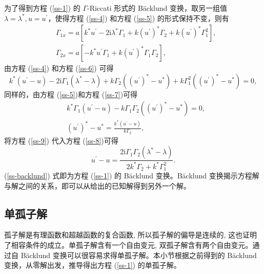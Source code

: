 为了得到方程 (\ref{ss-1}) 的 $\Gamma$-Riccati 形式的 B\"acklund 变换，取另一组值 $\lambda = \lambda^{*}, u = u^{'}$，使得方程 (\ref{ss-4}) 和方程 (\ref{ss-5}) 的形式保持不变，则有
\begin{align}
  & \Gamma_{1x} = a\left[k^{*}u^{'} - 2\mathrm{i}\lambda^{*}\Gamma_{1} + k(u^{'})^{*}\Gamma_{2} + k(u^{'})^{*}\Gamma_{1}^{2}\right], \label{ss-6} \\
  & \Gamma_{2x} = a\left[-k^{*}u^{'}\Gamma_{1} + k(u^{'})^{*}\Gamma_{1}\Gamma_{2}\right], \label{ss-7}
\end{align}
由方程 (\ref{ss-4}) 和方程 (\ref{ss-6}) 可得
\begin{equation}
  k^{*}(u^{'}-u) - 2\mathrm{i}\Gamma_{1}(\lambda^{*}-\lambda) + k\Gamma_{2}((u^{'})^{*}-u^{*}) + k\Gamma_{1}^{2}((u^{'})^{*}-u^{*}) = 0, \label{ss-8}
\end{equation}
同样的，由方程 (\ref{ss-5})和方程 (\ref{ss-7})可得
\begin{align}
  & k^{*}\Gamma_{1}(u^{'}-u) - k\Gamma_{1}\Gamma_{2}((u^{'})^{*}-u^{*}) = 0, \\
  & (u^{'})^{*} - u^{*} = \frac{k^{*}(u^{'}-u)}{k\Gamma_{2}}, \label{ss-9}
\end{align}
将方程 (\ref{ss-9}) 代入方程 (\ref{ss-8})可得
\begin{equation}
  u^{'} - u = \frac{2\mathrm{i}\Gamma_{1}\Gamma_{2}(\lambda^{*}-\lambda)}{2k^{*}\Gamma_{2} + k^{*}\Gamma_{1}^{2}}. \label{ss-backlund}
\end{equation}
(\ref{ss-backlund}) 式即为方程 (\ref{ss-1}) 的 B\"acklund 变换。B\"acklund 变换揭示方程解与解之间的关系，即可以从给出的已知解得到另外一个解。

\subsection{单孤子解}
孤子解是有理函数和超越函数的复合函数, 所以孤子解的偏导是连续的, 这也证明了相容条件的成立。单孤子解含有一个自由变元, 双孤子解含有两个自由变元。通过自 B\"{a}cklund 变换可以很容易求得单孤子解。本小节根据之前得到的 B\"acklund 变换，从零解出发，推导得出方程 (\ref{ss-1}) 的单孤子解。

